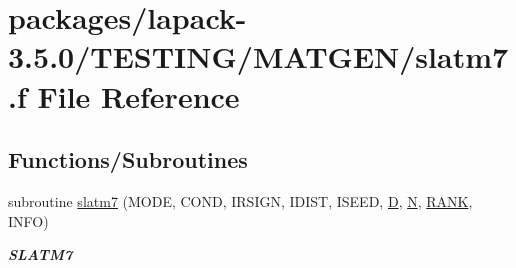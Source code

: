 \hypertarget{slatm7_8f}{}\section{packages/lapack-\/3.5.0/\+T\+E\+S\+T\+I\+N\+G/\+M\+A\+T\+G\+E\+N/slatm7.f File Reference}
\label{slatm7_8f}
\subsection*{Functions/\+Subroutines}
\begin{DoxyCompactItemize}
\item 
subroutine \hyperlink{group__real__matgen_ga0e590a52ca23b003f19a4c4375e07e5c}{slatm7} (M\+O\+D\+E, C\+O\+N\+D, I\+R\+S\+I\+G\+N, I\+D\+I\+S\+T, I\+S\+E\+E\+D, \hyperlink{odrpack_8h_a7dae6ea403d00f3687f24a874e67d139}{D}, \hyperlink{polmisc_8c_a0240ac851181b84ac374872dc5434ee4}{N}, \hyperlink{splinemodule_8c_a3a88bcc63386de30443dacede2e01847}{R\+A\+N\+K}, I\+N\+F\+O)
\begin{DoxyCompactList}\small\item\em {\bfseries S\+L\+A\+T\+M7} \end{DoxyCompactList}\end{DoxyCompactItemize}
